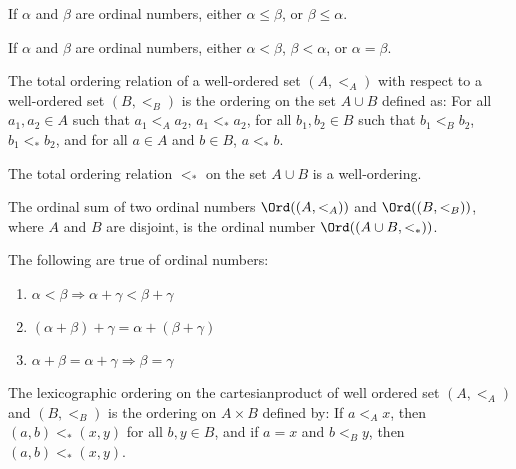         \begin{theorem}
            If $\alpha$ and $\beta$ are ordinal numbers, either
            ${\alpha}\leq{\beta}$, or ${\beta}\leq{\alpha}$.
        \end{theorem}
        \begin{theorem}
            If $\alpha$ and $\beta$ are ordinal numbers, either
            $\alpha<\beta$, $\beta<\alpha$, or $\alpha=\beta$.
        \end{theorem}
        \begin{definition}
           The total ordering relation of a
           well-ordered set $(A,<_{A})$ with respect
           to a well-ordered set $(B,<_{B})$ is the ordering
           on the set ${A}\cup{B}$ defined as: For all
           $a_{1},a_{2}\in{A}$ such that $a_{1}<_{A}a_{2}$,
           $a_{1}<_{*}a_{2}$, for all $b_{1},b_{2}\in{B}$
           such that $b_{1}<_{B}b_{2}$, $b_{1}<_{*}b_{2}$,
           and for all ${a}\in{A}$ and ${b}\in{B}$,
           ${a}<_{*}{b}$.
        \end{definition}
        \begin{theorem}
           The total ordering relation $<_{*}$ on the set
           ${A}\cup{B}$ is a well-ordering.
        \end{theorem}
        \begin{definition}
            The ordinal sum of two ordinal numbers $\Ord((A,<_{A}))$ and
            $\Ord((B,<_{B}))$, where $A$ and $B$ are disjoint, is the ordinal
            number $\Ord(({A}\cup{B},<_{*}))$.
        \end{definition}
        \begin{theorem}
           The following are true of ordinal numbers:
           \begin{enumerate}
                \item $\alpha<\beta\Rightarrow\alpha+\gamma<\beta+\gamma$
                \item $(\alpha+\beta)+\gamma=\alpha+(\beta+\gamma)$
                \item $\alpha+\beta=\alpha+\gamma\Rightarrow\beta=\gamma$
           \end{enumerate}
        \end{theorem}
        \begin{definition}
            The lexicographic ordering on the cartesianproduct of well
            ordered set $(A,<_{A})$ and $(B,<_{B})$ is the ordering on
            ${A}\times{B}$ defined by: If ${a}<_{A}{x}$, then
            $(a,b)<_{*}(x,y)$ for all $b,y\in{B}$, and if $a=x$ and
            $b<_{B}y$, then $(a,b)<_{*}(x,y)$.
        \end{definition}
